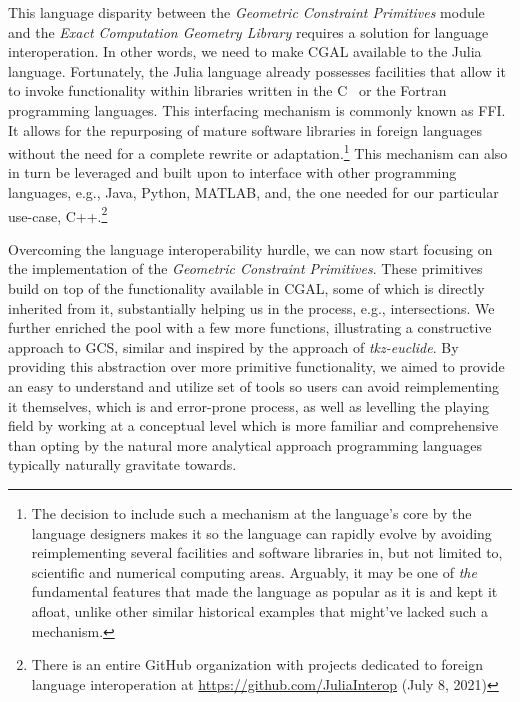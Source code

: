 This language disparity between the \textit{Geometric Constraint Primitives}
module and the \textit{Exact Computation Geometry Library} requires a solution
for language interoperation.  In other words, we need to make \ac{CGAL}
available to the Julia language.  Fortunately, the Julia language already
possesses facilities that allow it to invoke functionality within libraries
written in the C~\cite{Kernighan:1988:C} or the
Fortran~\cite{Backus:1957:Fortran} programming languages.  This interfacing
mechanism is commonly known as \ac{FFI}.  It allows for the repurposing of
mature software libraries in foreign languages without the need for a complete
rewrite or adaptation.\footnote{The decision to include such a mechanism at the
language's core by the language designers makes it so the language can rapidly
evolve by avoiding reimplementing several facilities and software libraries in,
but not limited to, scientific and numerical computing areas.  Arguably, it may
be one of \textit{the} fundamental features that made the language as popular as
it is and kept it afloat, unlike other similar historical examples that might've
lacked such a mechanism.  } This mechanism can also in
turn be leveraged and built upon to interface with other programming languages,
e.g., Java, Python, MATLAB, and, the one needed for our particular use-case,
C++.\footnote{There is an entire GitHub organization with projects dedicated to
foreign language interoperation at \url{https://github.com/JuliaInterop} (July
8, 2021)}

Overcoming the language interoperability hurdle, we can now start focusing on
the implementation of the \textit{Geometric Constraint Primitives}.  These
primitives build on top of the functionality available in \ac{CGAL}, some of
which is directly inherited from it, substantially helping us in the process,
e.g., intersections.  We further enriched the pool with a few more functions,
illustrating a constructive approach to \ac{GCS}, similar and inspired by the
approach of \textit{tkz-euclide}.  By providing this abstraction over more
primitive functionality, we aimed to provide an easy to understand and utilize
set of tools so users can avoid reimplementing it themselves, which is and
error-prone process, as well as levelling the playing field by working at a
conceptual level which is more familiar and comprehensive than opting by the
natural more analytical approach programming languages typically naturally
gravitate towards.


